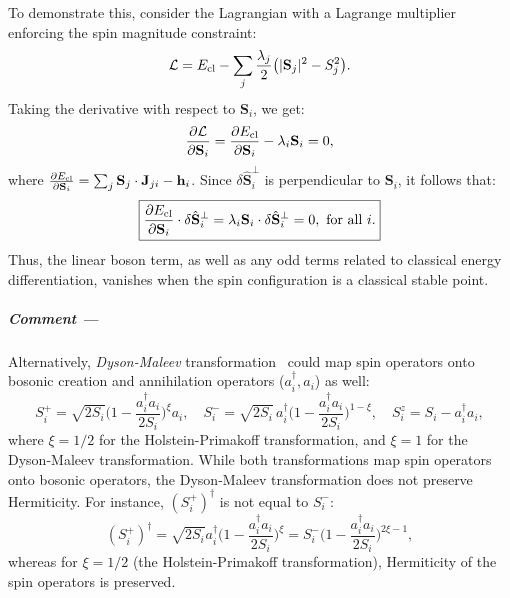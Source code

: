 To demonstrate this, consider the Lagrangian with a Lagrange multiplier enforcing the spin magnitude constraint:
\begin{equation}
    \mathcal{L} = E_{\rm cl} - \sum_{j} \frac{\lambda_{j}}{2} \big( |\mathbf{S}_{j}|^{2} - S_{j}^{2} \big).
\end{equation}
Taking the derivative with respect to $\mathbf{S}_{i}$, we get:
\begin{equation}
    \frac{\partial \mathcal{L}}{\partial \mathbf{S}_{i}} = \frac{\partial E_{\rm cl}}{\partial \mathbf{S}_{i}} - \lambda_{i} \mathbf{S}_{i} = 0,
\end{equation}
where $\frac{\partial E_{\rm cl}}{\partial \mathbf{S}_{i}} = \sum_{j} \mathbf{S}_{j} \cdot \mathbf{J}_{ji} - \mathbf{h}_{i}$. 
Since $\delta \hat{\mathbf{S}}_{i}^{\perp}$ is perpendicular to $\mathbf{S}_{i}$, it follows that:
\begin{equation}
    \boxed{\frac{\partial E_{\rm cl}}{\partial \mathbf{S}_{i}} \cdot \delta \hat{\mathbf{S}}_{i}^{\perp} = \lambda_{i} \mathbf{S}_{i} \cdot \delta \hat{\mathbf{S}}_{i}^{\perp} = 0, \text{ for all } i.} 
\end{equation}
Thus, the linear boson term, as well as any odd terms related to classical energy differentiation, vanishes when the spin configuration is a classical stable point.


\subparagraph{Comment ---}
Alternatively, \emph{Dyson-Maleev} transformation~\cite{PhysRev.102.1217, maleev1958scattering} could map spin operators onto bosonic creation and annihilation operators ($a_{i}^{\dagger}, a_{i}$) as well:
\begin{equation}\label{eq: spin-to-boson mapping}
        S^{+}_{i} = \sqrt{2S_{i}} \Big( 1 - \frac{a^{\dagger}_{i}a_{i}}{2S_{i}} \Big)^{\xi} a_{i}, \quad
        S^{-}_{i} = \sqrt{2S_{i}} \, a_{i}^{\dagger} \Big( 1 - \frac{a^{\dagger}_{i}a_{i}}{2S_{i}} \Big)^{1 - \xi}, \quad
        S_{i}^{z} = S_{i} - a^{\dagger}_{i} a_{i},
\end{equation}
where $\xi = 1/2$ for the Holstein-Primakoff transformation, and $\xi = 1$ for the Dyson-Maleev transformation. 
While both transformations map spin operators onto bosonic operators, the Dyson-Maleev transformation does not preserve Hermiticity. For instance, $(S^{+}_{i})^{\dagger}$ is not equal to $S^{-}_{i}$:
\begin{equation}
        (S^{+}_{i})^{\dagger} = \sqrt{2S_{i}} a^{\dagger}_{i} \Big( 1 - \frac{a^{\dagger}_{i} a_{i}}{2S_{i}} \Big)^{\xi} = S^{-}_{i} \Big( 1 - \frac{a^{\dagger}_{i} a_{i}}{2S_{i}} \Big)^{2\xi - 1},
\end{equation}
whereas for $\xi = 1/2$ (the Holstein-Primakoff transformation), Hermiticity of the spin operators is preserved.




